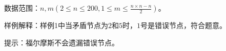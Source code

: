 


数据范围：$n,m(2\leqslant n\leqslant 200,1\leqslant m\leqslant \frac{n\times n-n}{2})$。

样例解释：样例1中当矛盾节点为$2$和$5$时，$1$号是错误节点，符合题意。

提示：福尔摩斯不会遗漏错误节点。